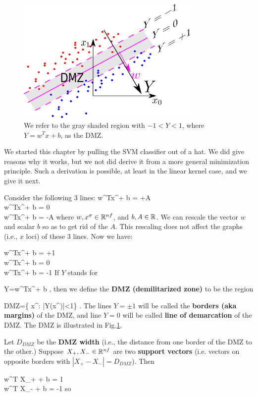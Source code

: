 \begin{figure}[h!]
\centering
\includegraphics[width=3.5in]
{svm/svm-dmz.png}
\caption{We refer to the gray shaded region
with $-1<Y<1$, where $Y= w^T x +b$,  
as the DMZ.}
\label{fig-svm-dmz}
\end{figure}

We started this
chapter by pulling the SVM classifier
out of a hat. We did give
reasons why it works, but we not did derive
it from a more general minimization
principle. Such a derivation
is possible, at least in the 
linear kernel case, and we give it next.


Consider the following 3 lines:
\beqa
w^Tx^\s + b = +A
\\
w^Tx^\s + b = 0
\\
w^Tx^\s + b = -A
\eeqa
where $w, x^\sigma\in { \mathbb{R}}^{nf}$, and $b,A\in { \mathbb{R}}$.
We can rescale the vector $w$ and 
scalar $b$ so as to get rid of the $A$.
This rescaling does not
affect the graphs (i.e., $x$ loci)
of these 3 lines. Now we have:


\beqa
w^Tx^\s + b = +1
\\
w^Tx^\s + b = 0
\\
w^Tx^\s + b = -1
\eeqa
If $Y$ stands for

\beq
Y=w^Tx^\s + b
\;,
\eeq
then we define
the {\bf DMZ (demilitarized zone)}
to be the region 

\beq
DMZ=\{  x^\s: |Y(x^\s)|<1\}
\;.
\eeq
The lines $Y=\pm 1$
will be called the {\bf borders (aka margins)}
of the DMZ, and 
line $Y=0$
will be called
{\bf line of demarcation}
of the DMZ.
The DMZ is illustrated in Fig.\ref{fig-svm-dmz}.

Let $D_{DMZ}$ be
the {\bf DMZ width} (i.e., 
the distance from one border
of the DMZ to the other.)
Suppose $X_+, X_-\in { \mathbb{R}}^{nf}$
are two {\bf support vectors}
(i.e. vectors on opposite borders
with $|X_+-X_-|=D_{DMZ}$). Then 

\beqa
w^T X_+ + b = 1
\\
w^T X_- + b = -1
\eeqa
so

